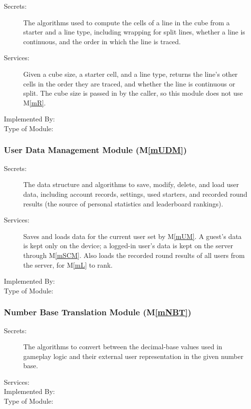 \documentclass[12pt, titlepage]{article}
\newcommand{\mref}[1]{M\ref{#1}}
\begin{document}
\begin{description}
\item[Secrets:] The algorithms used to compute the cells of a line in the cube from a starter and a line type, including wrapping for split lines, whether a line is continuous, and the order in which the line is traced.
\item[Services:] Given a cube size, a starter cell, and a line type, returns the line's other cells in the order they are traced, and whether the line is continuous or split. The cube size is passed in by the caller, so this module does not use \mref{mR}.
\item[Implemented By:]
\item[Type of Module:]
\end{description}

\subsubsection{User Data Management Module (\mref{mUDM})}

\begin{description}
\item[Secrets:] The data structure and algorithms to save, modify, delete, and load user data, including account records, settings, used starters, and recorded round results (the source of personal statistics and leaderboard rankings).
\item[Services:] Saves and loads data for the current user set by \mref{mUM}. A guest's data is kept only on the device; a logged-in user's data is kept on the server through \mref{mSCM}. Also loads the recorded round results of all users from the server, for \mref{mL} to rank.
\item[Implemented By:]
\item[Type of Module:]
\end{description}

\subsubsection{Number Base Translation Module (\mref{mNBT})}

\begin{description}
\item[Secrets:] The algorithms to convert between the decimal-base values used in gameplay logic and their external user representation in the given number base.
\item[Services:]
\item[Implemented By:]
\item[Type of Module:]
\end{description}
\end{document}
